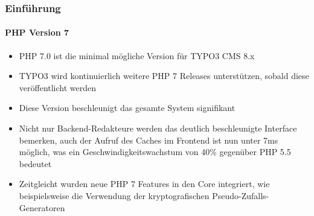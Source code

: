 \begin{frame}[fragile]
	\frametitle{Einführung}
	\framesubtitle{PHP Version 7}

	\begin{itemize}

		\item PHP 7.0 ist die minimal mögliche Version für TYPO3 CMS 8.x
		\item TYPO3 wird kontinuierlich weitere PHP 7 Releases unterstützen, sobald diese veröffentlicht werden
		\item Diese Version beschleunigt das gesamte System signifikant

		\item Nicht nur Backend-Redakteure werden das deutlich beschleunigte Interface bemerken, auch der Aufruf des Caches im Frontend ist nun unter 7ms möglich, was ein Geschwindigkeitswachstum von 40\% gegenüber PHP 5.5 bedeutet

		\item Zeitgleicht wurden neue PHP 7 Features in den Core integriert, wie beispielsweise die Verwendung der kryptografischen Pseudo-Zufalls-Generatoren

	\end{itemize}

\end{frame}

